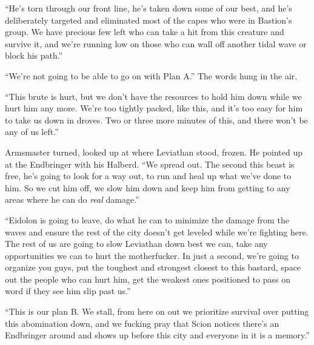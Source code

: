 ``He's torn through our front line, he's taken down some of our best, and he's deliberately targeted and eliminated most of the capes who were in Bastion's group.  We have precious few left who can take a hit from this creature and survive it, and we're running low on those who can wall off another tidal wave or block his path.''



``We're not going to be able to go on with Plan A.''  The words hung in the air.



``This brute is hurt, but we don't have the resources to hold him down while we hurt him any more.  We're too tightly packed, like this, and it's too easy for him to take us down in droves.   Two or three more minutes of this, and there won't be any of us left.''



Armsmaster turned, looked up at where Leviathan stood, frozen.  He pointed up at the Endbringer with his Halberd.  ``We spread out.  The second this beast is free, he's going to look for a way out, to run and heal up what we've done to him.   So we cut him off, we slow him down and keep him from getting to any areas where he can do \emph{real} damage.''



``Eidolon is going to leave, do what he can to minimize the damage from the waves and ensure the rest of the city doesn't get leveled while we're fighting here.  The rest of us are going to slow Leviathan down best we can, take any opportunities we can to hurt the motherfucker.  In just a second, we're going to organize you guys, put the toughest and strongest closest to this bastard, space out the people who can hurt him, get the weakest ones positioned to pass on word if they see him slip past us.''



``This is our plan B.  We stall, from here on out we prioritize survival over putting this abomination down, and we fucking pray that Scion notices there's an Endbringer around and shows up before this city and everyone in it is a memory.''





